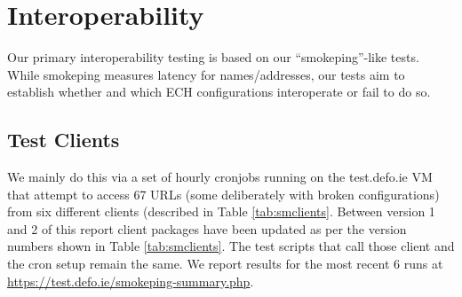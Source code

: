 \section{Interoperability}

Our primary interoperability testing is based on our ``smokeping''-like tests.
While smokeping measures latency for names/addresses, our tests aim to establish
whether and which ECH configurations interoperate or fail to do so.

\subsection{Test Clients}

We mainly do this via a set of hourly cronjobs running on the test.defo.ie VM
that attempt to access 67 URLs (some deliberately with broken configurations)
from six different clients (described in Table \ref{tab:smclients}.
Between version 1 and 2 of this report client packages have been updated as
per the version numbers shown in Table \ref{tab:smclients}. The test scripts
that call those client and the cron setup remain the same.
We report results for the most recent 6 runs at
\url{https://test.defo.ie/smokeping-summary.php}.

